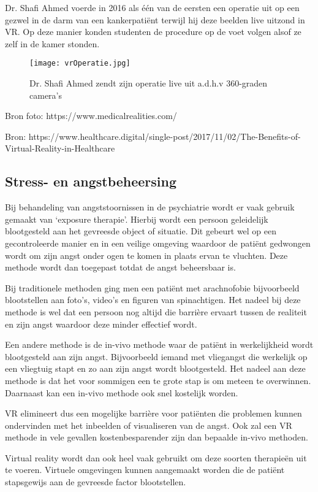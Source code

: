 Dr. Shafi Ahmed voerde in 2016  als één van de eersten een operatie uit op een gezwel in de darm van een kankerpatiënt terwijl hij deze beelden live uitzond in VR. Op deze manier konden studenten de procedure op de voet volgen alsof ze zelf in de kamer stonden.

\begin{figure}[h]
	\centering
	\texttt{[image: vrOperatie.jpg]}
	\caption{Dr. Shafi Ahmed zendt zijn operatie live uit a.d.h.v 360-graden camera's}
\end{figure}

Bron foto: https://www.medicalrealities.com/

Bron: https://www.healthcare.digital/single-post/2017/11/02/The-Benefits-of-Virtual-Reality-in-Healthcare

\subsection{Stress- en angstbeheersing}  
Bij behandeling van angststoornissen in de psychiatrie wordt er vaak gebruik gemaakt van ‘exposure therapie’. Hierbij wordt een persoon geleidelijk blootgesteld aan het gevreesde object of situatie. Dit gebeurt wel op een gecontroleerde manier en in een veilige omgeving waardoor de patiënt gedwongen wordt om zijn angst onder ogen te komen in plaats ervan te vluchten. Deze methode wordt dan toegepast totdat de angst beheersbaar is. 

Bij traditionele methoden ging men een patiënt met arachnofobie bijvoorbeeld blootstellen aan foto’s, video’s en figuren van spinachtigen. Het nadeel bij deze methode is wel dat een persoon nog altijd die barrière ervaart tussen de realiteit en zijn angst waardoor deze minder effectief wordt.

Een andere methode is de in-vivo methode waar de patiënt in werkelijkheid wordt blootgesteld aan zijn angst. Bijvoorbeeld iemand met vliegangst die werkelijk op een vliegtuig stapt en zo aan zijn angst wordt blootgesteld. Het nadeel aan deze methode is dat het voor sommigen een te grote stap is om meteen te overwinnen. Daarnaast kan een in-vivo methode ook snel kostelijk worden.

VR elimineert dus een mogelijke barrière voor patiënten die problemen kunnen ondervinden met het inbeelden of visualiseren van de angst. Ook zal een VR methode in vele gevallen kostenbesparender zijn dan bepaalde in-vivo methoden.

Virtual reality wordt dan ook heel vaak gebruikt om deze soorten therapieën uit te voeren. Virtuele omgevingen kunnen aangemaakt worden die de patiënt stapsgewijs aan de gevreesde factor blootstellen.

